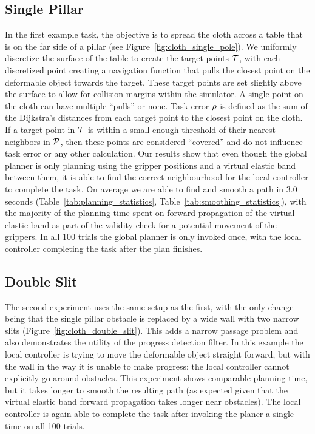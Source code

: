\subsection{Single Pillar}
\label{sec:single_pillar}

In the first example task, the objective is to spread the cloth across a table that is on the far side  of a pillar (see Figure~\ref{fig:cloth_single_pole}). We uniformly discretize the surface of the table to create the target points $\mathcal{T}$, with each discretized point creating a navigation function that pulls the closest point on the deformable object towards the target. These target points are set slightly above the surface to allow for collision margins within the simulator. A single point on the cloth can have multiple ``pulls'' or none. Task error $\rho$ is defined as the sum of the Dijkstra's distances from each target point to the closest point on the cloth. If a target point in $\mathcal{T}$ is within a small-enough threshold of their nearest neighbors in $\mathcal{P}$, then these points are considered ``covered'' and do not influence task error or any other calculation. Our results show that even though the global planner is only planning using the gripper positions and a virtual elastic band between them, it is able to find the correct neighbourhood for the local controller to complete the task. On average we are able to find and smooth a path in 3.0 seconds (Table~\ref{tab:planning_statistics}, Table~\ref{tab:smoothing_statistics}), with the majority of the planning time spent on forward propagation of the virtual elastic band as part of the validity check for a potential movement of the grippers. In all 100 trials the global planner is only invoked once, with the local controller completing the task after the plan finishes.









\subsection{Double Slit}
\label{sec:double_slit}
The second experiment uses the same setup as the first, with the only change being that the single pillar obstacle is replaced by a wide wall with two narrow slits (Figure~\ref{fig:cloth_double_slit}). This adds a narrow passage problem and also demonstrates the utility of the progress detection filter. In this example the local controller is trying to move the deformable object straight forward, but with the wall in the way it is unable to make progress; the local controller cannot explicitly go around obstacles. This experiment shows comparable planning time, but it takes longer to smooth the resulting path (as expected given that the virtual elastic band forward propagation takes longer near obstacles). The local controller is again able to complete the task after invoking the planer a single time on all 100 trials.



